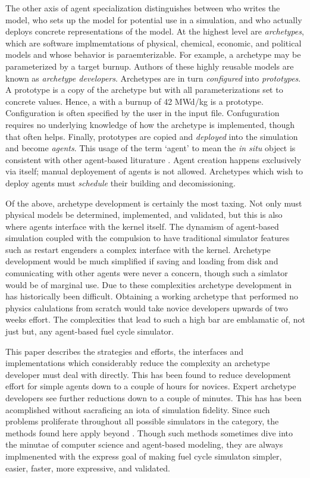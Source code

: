 The other axis of agent specialization distinguishes between who 
writes the model, who sets up the model for potential use in a simulation,
and who actually deploys concrete representations of the model.
At the highest level are \emph{archetypes}, which are software implmemtations
of physical, chemical, economic, and political models and whose behavior
is paraemterizable. For example, a  archetype may be 
parameterized by a target burnup. Authors of these highly reusable models 
are known as \emph{archetype developers}. Archetypes are in turn 
\emph{configured} into \emph{prototypes}. A prototype is a copy 
of the archetype but with all parameterizations set to concrete 
values. Hence, a  with a burnup of 42 MWd/kg is a 
prototype. Configuration is often specified by the \cyclus user 
in the input file. Confuguration requires no underlying knowledge of 
how the archetype is implemented, though that often helps.
Finally, prototypes are copied and \emph{deployed} into the simulation 
and become \emph{agents}. This usage of the term `agent' to mean 
the \emph{in situ} object is consistent with other agent-based
liturature \citeme.  Agent creation happens exclusively via 
\cyclus itself; manual deployement of agents is not allowed.
Archetypes which wish to deploy agents must \emph{schedule} their building
and decomissioning.

Of the above, archetype development is certainly the most taxing.
Not only must physical models be determined, implemented, and 
validated, but this is also where agents interface with the 
\cyclus kernel itself. The dynamism of agent-based simulation 
coupled with the compulsion to have traditional simulator features 
such as restart engenders a complex interface with the kernel.
Archetype development would be much simplified if saving and 
loading from disk and comunicating with other agents were 
never a concern, though such a simlator would be of marginal use.
Due to these complexities archetype development in \cyclus
has historically been difficult. Obtaining a working archetype
that performed no physics calulations from scratch would 
take novice developers upwards of two weeks effort.  The complexities
that lead to such a high bar are emblamatic of, not just \cyclus
but, any agent-based fuel cycle simulator.

This paper describes the strategies and efforts, the interfaces
and implementations which considerably reduce the complexity  
an archetype developer must deal with directly. This has been 
found to reduce development effort for simple agents down to a couple 
of hours for novices. Expert archetype developers see further 
reductions down to a couple of minutes. This has has been acomplished 
without sacraficing an iota of simulation fidelity. Since such 
problems proliferate throughout all possible simulators in 
the \cyclus category, the methods found here apply beyond \cyclus.
Though such methods sometimes dive into the minutae of 
computer science and agent-based modeling, they are always implmenented
with the express goal of making fuel cycle simulaton 
simpler, easier, faster, more expressive, and validated.


